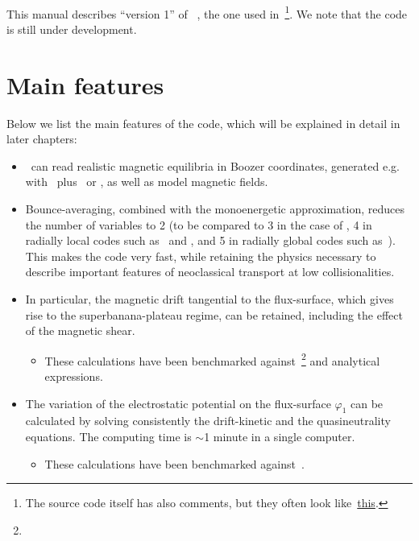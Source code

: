 \

This manual describes ``version 1'' of \KNOSOS~, the one used in~\citep{velasco2019knosos}\footnote{The source code itself has also comments, but they often look like~\href{https://twitter.com/bercut2000/status/1009709520220803072?s=19}{this}.}. We note that the code is still under development.
\section{Main features}

Below we list the main features of the code, which will be explained in detail in later chapters:

\begin{itemize}

\item \KNOSOS~can read realistic magnetic equilibria in Boozer coordinates, generated e.g. with \VMEC~plus \BOOZERXFORM~or \COTRANS, as well as model magnetic fields.

\item Bounce-averaging, combined with the monoenergetic approximation, reduces the number of variables to 2 (to be compared to 3 in the case of \DKES, 4 in radially local codes such as \EUTERPE~and \SFINCS, and 5 in radially global codes such as~\FORTEC). This makes the code very fast, while retaining the physics necessary to describe important features of neoclassical transport at low collisionalities. 

\item In particular, the magnetic drift tangential to the flux-surface, which gives rise to the superbanana-plateau regime, can be retained, including the effect of the magnetic shear.
\begin{itemize}
\item These calculations have been benchmarked against~\todo{\FORTEC}\footnote{} and analytical expressions.
\end{itemize}

\item The variation of the electrostatic potential on the flux-surface $\varphi_1$ can be calculated by solving consistently the drift-kinetic and the quasineutrality equations. The computing time is $\sim$1 minute in a single computer.
\begin{itemize}
\item These calculations have been benchmarked against~\EUTERPE.
\end{itemize}


\end{itemize}
